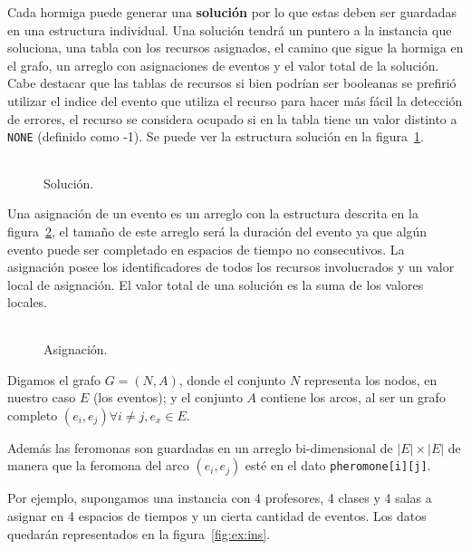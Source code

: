 \documentclass[letter, 10pt]{article}
\renewcommand{\tt}[1]{\texttt{#1}}
\renewcommand{\bf}[1]{\textbf{#1}}
\begin{document}
Cada hormiga puede generar una \bf{solución} por lo que estas deben ser
guardadas en una estructura individual. Una solución tendrá un puntero a la
instancia que soluciona, una tabla con los recursos asignados, el camino que
sigue la hormiga en el grafo, un arreglo con asignaciones de eventos y el valor
total de la solución. Cabe destacar que las tablas de recursos si bien podrían
ser booleanas se prefirió utilizar el indice del evento que utiliza el recurso
para hacer más fácil la detección de errores, el recurso se considera ocupado
si en la tabla tiene un valor distinto a \tt{NONE} (definido como -1).
Se puede ver la estructura solución en la figura~\ref{fig:result}.

\begin{figure}[htpb]
  \centering
  \begin{tabular}{c}
    
  \end{tabular}
  \caption{Solución.}
  \label{fig:result}
\end{figure}

Una asignación de un evento es un arreglo con la estructura descrita en la
figura~\ref{fig:assign}, el tamaño de este arreglo será la duración del evento
ya que algún evento puede ser completado en espacios de tiempo no consecutivos.
La asignación posee los identificadores de todos los recursos involucrados y un
valor local de asignación. El valor total de una solución es la suma de los
valores locales.

\begin{figure}[htpb]
  \centering
  \begin{tabular}{c}
    
  \end{tabular}
  \caption{Asignación.}
  \label{fig:assign}
\end{figure}

Digamos el grafo $G=(N,A)$, donde el conjunto $N$ representa los nodos, en
nuestro caso $E$ (los eventos); y el conjunto $A$ contiene los arcos, al ser
un grafo completo $(e_i, e_j) \forall i \neq j, e_x \in E$.

Además las feromonas son guardadas en un arreglo bi-dimensional de
$|E|\times|E|$ de manera que la feromona del arco $(e_i, e_j)$ esté en el dato
\tt{pheromone[i][j]}.

Por ejemplo, supongamos una instancia con 4 profesores, 4 clases y 4 salas a
asignar en 4 espacios de tiempos y un cierta cantidad de eventos. Los datos
quedarán representados en la figura~\ref{fig:ex:ins}.
\end{document}

